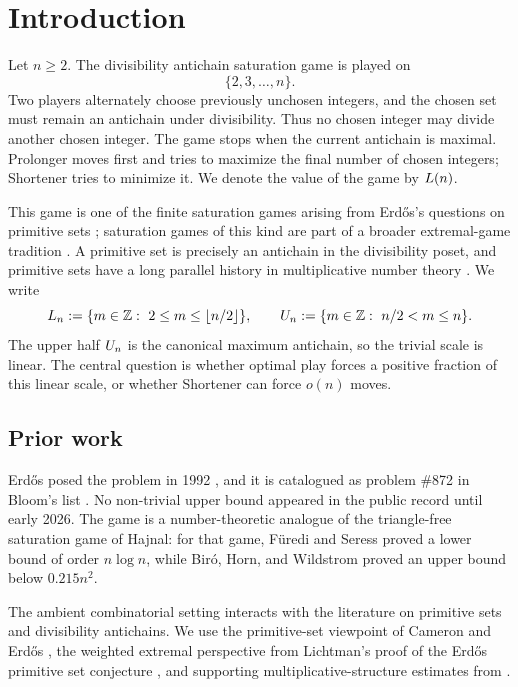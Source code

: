 \section{Introduction}\label{sec:introduction}

Let $n\ge 2$.  The divisibility antichain saturation game is played on
\[
  \{2,3,\ldots,n\}.
\]
Two players alternately choose previously unchosen integers, and the chosen set
must remain an antichain under divisibility.  Thus no chosen integer may divide
another chosen integer.  The game stops when the current antichain is maximal.
Prolonger moves first and tries to maximize the final number of chosen
integers; Shortener tries to minimize it.  We denote the value of the game by
$L(n)$.

This game is one of the finite saturation games arising from Erd\H{o}s's
questions on primitive sets \cite{Er92c}; saturation games of this kind are
part of a broader extremal-game tradition \cite{FuSe91,BPW16}.  A primitive set
is precisely an antichain in the divisibility poset, and primitive sets have a
long parallel history in multiplicative number theory
\cite{CaEr90,Lichtman23,MartinPomerance10,Kucheriaviy24}.  We write
\[
  L_n:=\{m\in\mathbb Z:\ 2\le m\le \lfloor n/2\rfloor\},
  \qquad
  U_n:=\{m\in\mathbb Z:\ n/2<m\le n\}.
\]
The upper half $U_n$ is the canonical maximum antichain, so the trivial scale
is linear.  The
central question is whether optimal play forces a positive fraction of this
linear scale, or whether Shortener can force $o(n)$ moves.

\subsection{Prior work}

Erd\H{o}s posed the problem in 1992 \cite{Er92c}, and it is catalogued as
problem \#872 in Bloom's list \cite{Bloom872}.  No non-trivial upper bound
appeared in the public record until early 2026.  The game is a
number-theoretic analogue of the triangle-free saturation game of Hajnal:
for that game, F{\"u}redi and Seress \cite{FuSe91} proved a lower bound of
order $n\log n$, while Bir{\'o}, Horn, and Wildstrom \cite{BPW16} proved an
upper bound below $0.215n^2$.

The ambient combinatorial setting interacts with the literature on primitive
sets and divisibility antichains.  We use the primitive-set viewpoint of
Cameron and Erd\H{o}s \cite{CaEr90}, the weighted extremal perspective from
Lichtman's proof of the Erd\H{o}s primitive set conjecture \cite{Lichtman23},
and supporting multiplicative-structure estimates from
\cite{Kucheriaviy24,MartinPomerance10}.

